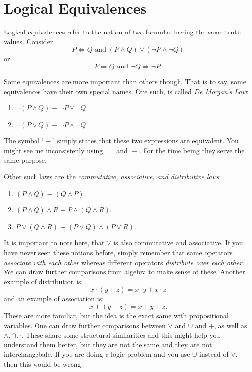 \section{Logical Equivalences}
Logical equivalences refer to the notion of two formulas having the same truth values. Consider 
$$
P \Leftrightarrow Q \text{ and } (P\land Q)\lor (\neg P\land \neg Q)
$$
or 
$$
P \Rightarrow Q \text{ and } \neg Q\Rightarrow \neg P.
$$

Some equivalences are more important than others though. That is to say, some equivalences have their own special names. One such, is called \emph{De Morgan's Law}:
\begin{enumerate}
    \item $\neg(P\land Q) \equiv \neg P\lor \neg Q$
    \item $\neg(P\lor Q) \equiv \neg P\land \neg Q$
\end{enumerate}
The symbol `$\equiv$' simply states that these two expressions are equivalent. You might see me inconsistenly using $=$ and $\equiv$. For the time being they serve the same purpose.

Other such laws are the \emph{commutative, associative, and distributive laws}: 
\begin{enumerate}
    \item [Commutative] $(P\land Q)\equiv(Q\land P)$.
    \item [Associative] $(P\land Q)\land R\equiv P\land (Q\land R)$.
    \item [Distributive] $P\lor(Q\land R)\equiv (P\lor Q)\land (P\lor R)$. 
\end{enumerate}
It is important to note here, that $\lor$ is also commutative and associative. If you have never seen these notions before, simply remember that same operators \emph{associate with each other} whereas different operators \emph{distribute over each other}. 
We can draw further comparisons from algebra to make sense of these. Another example of distribution is:
$$
x \cdot (y + z) = x\cdot y + x\cdot z
$$
and an example of association is: 
$$
x+(y+z) = x + y + z.
$$
These are more familiar, but the idea is the exact same with propositional variables. One can draw further comparisons between $\lor$ and $\cup$ and $+$, as well as $\land,\cap,\cdot$. These share some structural similarities and this might help you understand them better, but they are not the same and they are not interchangebale. If you are doing a logic problem and you use $\cup$ instead of $\lor$, then this would be wrong.

